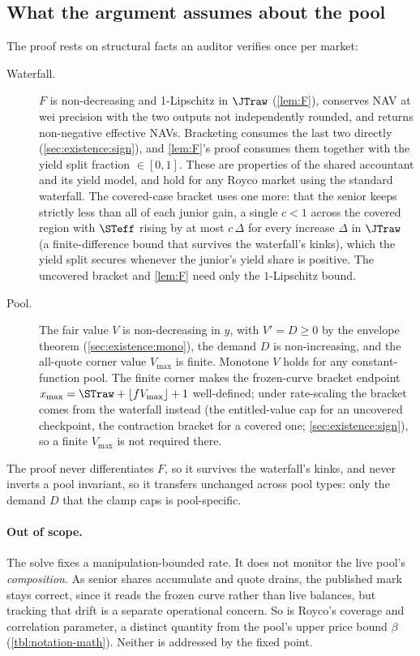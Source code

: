 \subsection{What the argument assumes about the pool}
\label{sec:existence:generality}

The proof rests on structural facts an auditor verifies once per
market:

\begin{description}
  \item[Waterfall.] $F$ is non-decreasing and 1-Lipschitz in $\JTraw$
    (\cref{lem:F}), conserves NAV at wei precision with the two outputs
    not independently rounded, and returns non-negative effective NAVs.
    Bracketing consumes the last two directly
    (\cref{sec:existence:sign}), and \cref{lem:F}'s proof consumes them
    together with the yield split fraction $\in [0, 1]$. These are
    properties of the shared accountant and its yield model, and hold
    for any Royco market using the standard waterfall. The covered-case
    bracket uses one more: that the senior keeps strictly less than all
    of each junior gain, a single $c < 1$ across the covered region with
    $\STeff$ rising by at most $c\,\Delta$ for every increase $\Delta$ in
    $\JTraw$ (a finite-difference bound that survives the waterfall's
    kinks), which the yield split secures whenever the junior's yield
    share is positive. The uncovered bracket and \cref{lem:F} need only
    the $1$-Lipschitz bound.
  \item[Pool.] The fair value $V$ is non-decreasing in $y$, with
    $V' = D \geq 0$ by the envelope theorem (\cref{sec:existence:mono}),
    the demand $D$ is non-increasing, and the all-quote corner value
    $V_{\max}$ is finite. Monotone $V$ holds for any constant-function
    pool. The finite corner makes the frozen-curve bracket endpoint
    $x_{\max} = \STraw + \lfloor f V_{\max}\rfloor + 1$ well-defined;
    under rate-scaling the bracket comes from the waterfall instead (the
    entitled-value cap for an uncovered checkpoint, the contraction
    bracket for a covered one; \cref{sec:existence:sign}), so a finite
    $V_{\max}$ is not required there.
\end{description}

The proof never differentiates $F$, so it survives the
waterfall's kinks, and never inverts a pool invariant, so it transfers
unchanged across pool types: only the demand $D$ that the clamp caps is
pool-specific.

\paragraph{Out of scope.}
The solve fixes a manipulation-bounded rate. It does not monitor the
live pool's \emph{composition}. As senior shares accumulate and quote
drains, the published mark stays correct, since it reads the frozen
curve rather than live balances, but tracking that drift is a separate
operational concern. So is Royco's coverage and correlation parameter, a distinct
quantity from the pool's upper price bound $\beta$
(\cref{tbl:notation-math}). Neither is addressed by the fixed point.
